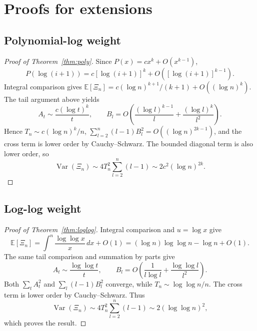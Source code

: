 \documentclass[11pt]{article}
\begin{document}
\section{Proofs for extensions}

\subsection{Polynomial-log weight}
\begin{proof}[Proof of Theorem~\ref{thm:poly}]
Since $P(x)=cx^k+O(x^{k-1})$,
\[
P(\log(i+1))=c[\log(i+1)]^k+O([\log(i+1)]^{k-1}).
\]
Integral comparison gives
$\mathbb E[\Xi_n]=c(\log n)^{k+1}/(k+1)+O((\log n)^k)$.
The tail argument above yields
\[
A_t\sim\frac{c(\log t)^k}{t},\qquad
B_l=O\left(\frac{(\log l)^{k-1}}{l}+\frac{(\log l)^k}{l^2}\right).
\]
Hence $T_n\sim c(\log n)^k/n$,
$\sum_{l=2}^n(l-1)B_l^2=O((\log n)^{2k-1})$, and the cross term is lower
order by Cauchy--Schwarz.  The bounded diagonal term is also lower order, so
\[
\operatorname{Var}(\Xi_n)
\sim4T_n^2\sum_{l=2}^n(l-1)\sim2c^2(\log n)^{2k}.
\]
\end{proof}

\subsection{Log-log weight}
\begin{proof}[Proof of Theorem~\ref{thm:loglog}]
Integral comparison and $u=\log x$ give
\[
\mathbb E[\Xi_n]
=\int^n\frac{\log\log x}{x}\,dx+O(1)
=(\log n)\log\log n-\log n+O(1).
\]
The same tail comparison and summation by parts give
\[
A_t\sim\frac{\log\log t}{t},\qquad
B_l=O\left(\frac1{l\log l}+\frac{\log\log l}{l^2}\right).
\]
Both $\sum_tA_t^2$ and $\sum_l(l-1)B_l^2$ converge, while
$T_n\sim\log\log n/n$.  The cross term is lower order by Cauchy--Schwarz.
Thus
\[
\operatorname{Var}(\Xi_n)
\sim4T_n^2\sum_{l=2}^n(l-1)\sim2(\log\log n)^2,
\]
which proves the result.
\end{proof}
\end{document}
